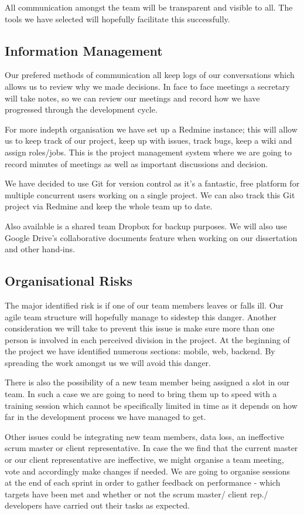 \documentclass{l3proj}
\begin{document}
All communication amongst the team will be transparent and visible to all. The tools we have selected will hopefully facilitate this successfully.

\subsection{Information Management}Our prefered methods of communication all keep logs of our conversations which allows us to review why we made decisions. In face to face meetings a secretary will take notes, so we can review our meetings and record how we have progressed through the development cycle.

For more indepth organisation we have set up a Redmine instance; this will allow us to keep track of our project, keep up with issues, track bugs, keep a wiki and assign roles/jobs. This is the project management system where we are going to record minutes of meetings as well as important discussions and decision.

We have decided to use \gls{Git} for version control as it’s a fantastic, free platform for multiple concurrent users working on a single project. We can also track this Git project via Redmine and keep the whole team up to date.

Also available is a shared team Dropbox for backup purposes. We will also use Google Drive’s collaborative documents feature when working on our dissertation and other hand-ins.

\subsection{Organisational Risks}The major identified risk is if one of our team members leaves or falls ill. Our agile team structure will hopefully manage to sidestep this danger. Another consideration we will take to prevent this issue is make sure more than one person is involved in each perceived division in the project. At the beginning of the project we have identified numerous sections: mobile, web, backend. By spreading the work amongst us we will avoid this danger.

There is also the possibility of a new team member being assigned a slot in our team. In such a case we are going to need to bring them up to speed with a training session which cannot be specifically limited in time as it depends on how far in the development process we have managed to get.

Other issues could be integrating new team members, data loss, an ineffective scrum master or client representative. In case the we find that the current master or our client representative are ineffective, we might organise a team meeting, vote and accordingly make changes if needed. We are going to organise sessions at the end of each sprint in order to gather feedback on performance - which targets have been met and whether or not the scrum master/ client rep./ developers have carried out their tasks as expected.
\end{document}
